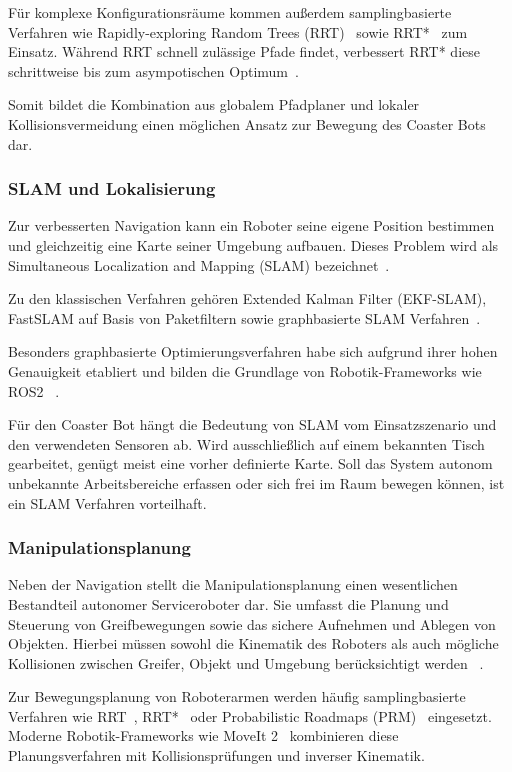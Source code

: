 \documentclass[
  a4paper,
  12pt,
  DIV=12,        %
  parskip=half,  %
  headings=small %
]{scrartcl}
\theoremstyle{definition}
\theoremstyle{definition}
\begin{document}
Für komplexe Konfigurationsräume kommen außerdem samplingbasierte Verfahren wie
Rapidly-exploring Random Trees (RRT)~\cite{RRT} sowie RRT*~\cite{RRTStar} zum Einsatz.
Während RRT schnell zulässige Pfade findet, verbessert RRT* diese schrittweise
bis zum asympotischen Optimum~\cite{RRTStar}.

Somit bildet die Kombination aus globalem Pfadplaner und lokaler
Kollisionsvermeidung einen möglichen Ansatz zur Bewegung des Coaster Bots dar.

\subsubsection{SLAM und Lokalisierung}

Zur verbesserten Navigation kann ein Roboter seine eigene Position bestimmen und
gleichzeitig eine Karte seiner Umgebung aufbauen. Dieses Problem wird als
Simultaneous Localization and Mapping (SLAM) bezeichnet~\cite{SLAM}.

Zu den klassischen Verfahren gehören Extended Kalman Filter (EKF-SLAM),
FastSLAM auf Basis von Paketfiltern sowie graphbasierte SLAM Verfahren~\cite{EKF,EKF-SLAM,FastSLAM}.

Besonders graphbasierte Optimierungsverfahren habe sich aufgrund ihrer hohen
Genauigkeit etabliert und bilden die Grundlage von Robotik-Frameworks wie ROS2
~\cite{ROS2}.

Für den Coaster Bot hängt die Bedeutung von SLAM vom Einsatzszenario und den
verwendeten Sensoren ab. Wird ausschließlich auf einem bekannten Tisch
gearbeitet, genügt meist eine vorher definierte Karte. Soll das System autonom
unbekannte Arbeitsbereiche erfassen oder sich frei im Raum bewegen können, ist
ein SLAM Verfahren vorteilhaft.

\subsubsection{Manipulationsplanung}

Neben der Navigation stellt die Manipulationsplanung einen wesentlichen
Bestandteil autonomer Serviceroboter dar. Sie umfasst die Planung und Steuerung
von Greifbewegungen sowie das sichere Aufnehmen und Ablegen von Objekten.
Hierbei müssen sowohl die Kinematik des Roboters als auch mögliche Kollisionen
zwischen Greifer, Objekt und Umgebung berücksichtigt werden
~\cite{ManipulationCBiRRT,MotionPlanning}.

Zur Bewegungsplanung von Roboterarmen werden häufig samplingbasierte Verfahren
wie RRT~\cite{RRT}, RRT*~\cite{RRTStar} oder Probabilistic Roadmaps (PRM)~\cite{PRM}
eingesetzt. Moderne Robotik-Frameworks wie MoveIt 2~\cite{MoveIt2} kombinieren diese
Planungsverfahren mit Kollisionsprüfungen und inverser Kinematik.
\end{document}
